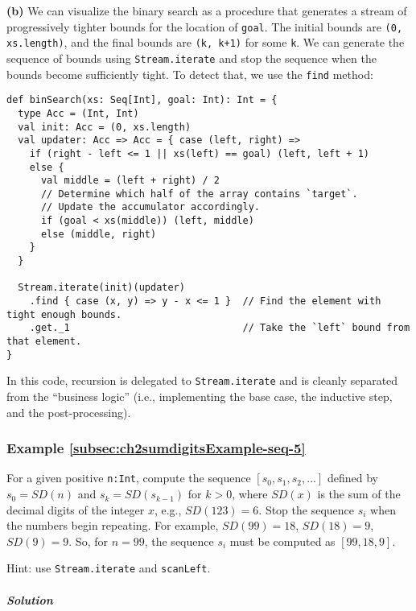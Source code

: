 \textbf{(b)} We can visualize the binary search as a procedure that
generates a stream of progressively tighter bounds for the location
of \lstinline!goal!. The initial bounds are \lstinline!(0, xs.length)!,
and the final bounds are \lstinline!(k, k+1)! for some \lstinline!k!.
We can generate the sequence of bounds using \lstinline!Stream.iterate!
and stop the sequence when the bounds become sufficiently tight. To
detect that, we use the \lstinline!find! method:
\begin{lstlisting}
def binSearch(xs: Seq[Int], goal: Int): Int = {
  type Acc = (Int, Int)
  val init: Acc = (0, xs.length)
  val updater: Acc => Acc = { case (left, right) =>
    if (right - left <= 1 || xs(left) == goal) (left, left + 1)
    else {
      val middle = (left + right) / 2
      // Determine which half of the array contains `target`.
      // Update the accumulator accordingly.
      if (goal < xs(middle)) (left, middle)
      else (middle, right)
    }
  }

  Stream.iterate(init)(updater)
    .find { case (x, y) => y - x <= 1 }  // Find the element with tight enough bounds.
    .get._1                              // Take the `left` bound from that element.
}
\end{lstlisting}
In this code, recursion is delegated to \lstinline!Stream.iterate!
and is cleanly separated from the \textsf{``}business logic\textsf{''} (i.e., implementing
the base case, the inductive step, and the post-processing).

\subsubsection{Example \label{subsec:ch2sumdigitsExample-seq-5}\ref{subsec:ch2sumdigitsExample-seq-5}}

For a given positive \lstinline!n:Int!, compute the sequence $\left[s_{0},s_{1},s_{2},...\right]$
defined by $s_{0}=SD(n)$ and $s_{k}=SD(s_{k-1})$ for $k>0$, where
$SD(x)$ is the sum of the decimal digits of the integer $x$, e.g.,
$SD(123)=6$. Stop the sequence $s_{i}$ when the numbers begin repeating.
For example, $SD(99)=18$, $SD(18)=9$, $SD(9)=9$. So, for $n=99$,
the sequence $s_{i}$ must be computed as $\left[99,18,9\right]$.

Hint: use \lstinline!Stream.iterate! and \lstinline!scanLeft!.

\subparagraph{Solution}

